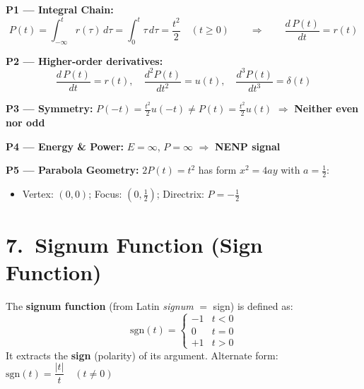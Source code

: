 \documentclass[10pt,a4paper]{article}
\newcommand{\Intt}{\displaystyle\int_{-\infty}^{t}}
\begin{document}
\begin{center}
\end{center}

\begin{propbox}
\textbf{P1 --- Integral Chain:}
\[
  P(t) = \Intt r(\tau)\,d\tau = \int_0^t \tau\,d\tau = \frac{t^2}{2} \quad (t\geq0)
  \qquad\Rightarrow\qquad \frac{d\,P(t)}{dt} = r(t)
\]

\textbf{P2 --- Higher-order derivatives:}
\[
  \frac{d\,P(t)}{dt}=r(t),\quad \frac{d^2P(t)}{dt^2}=u(t),\quad \frac{d^3P(t)}{dt^3}=\delta(t)
\]

\textbf{P3 --- Symmetry:} $P(-t)=\tfrac{t^2}{2}u(-t)\neq P(t)=\tfrac{t^2}{2}u(t)$ $\Rightarrow$ \textbf{Neither even nor odd}

\textbf{P4 --- Energy \& Power:} $E=\infty$, $P=\infty$ $\Rightarrow$ \textbf{NENP signal}

\textbf{P5 --- Parabola Geometry:} $2P(t) = t^2$ has form $x^2=4ay$ with $a=\tfrac{1}{2}$:
\begin{itemize}
  \item Vertex: $(0,0)$; \quad Focus: $(0,\tfrac{1}{2})$; \quad Directrix: $P=-\tfrac{1}{2}$
\end{itemize}
\end{propbox}

\section{7.\ Signum Function (Sign Function)}

\begin{defbox}
The \textbf{signum function} (from Latin \textit{signum} $=$ sign) is defined as:
\[
  \text{sgn}(t) = \begin{cases} -1 & t < 0 \\ 0 & t = 0 \\ +1 & t > 0 \end{cases}
\]
It extracts the \textbf{sign} (polarity) of its argument. Alternate form: $\text{sgn}(t) = \dfrac{|t|}{t} \quad (t \neq 0)$
\end{defbox}
\end{document}

